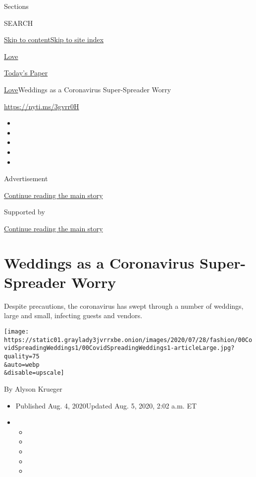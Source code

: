 Sections

SEARCH

\protect\hyperlink{site-content}{Skip to
content}\protect\hyperlink{site-index}{Skip to site index}

\href{https://www.nytimes3xbfgragh.onion/section/fashion/weddings}{Love}

\href{https://myaccount.nytimes3xbfgragh.onion/auth/login?response_type=cookie\&client_id=vi}{}

\href{https://www.nytimes3xbfgragh.onion/section/todayspaper}{Today's
Paper}

\href{/section/fashion/weddings}{Love}\textbar{}Weddings as a
Coronavirus Super-Spreader Worry

\url{https://nyti.ms/3gvrr0H}

\begin{itemize}
\item
\item
\item
\item
\item
\end{itemize}

Advertisement

\protect\hyperlink{after-top}{Continue reading the main story}

Supported by

\protect\hyperlink{after-sponsor}{Continue reading the main story}

\hypertarget{weddings-as-a-coronavirus-super-spreader-worry}{%
\section{Weddings as a Coronavirus Super-Spreader
Worry}\label{weddings-as-a-coronavirus-super-spreader-worry}}

Despite precautions, the coronavirus has swept through a number of
weddings, large and small, infecting guests and vendors.

\texttt{[image: https://static01.graylady3jvrrxbe.onion/images/2020/07/28/fashion/00CovidSpreadingWeddings1/00CovidSpreadingWeddings1-articleLarge.jpg?quality=75\\\&auto=webp\\\&disable=upscale]}

By Alyson Krueger

\begin{itemize}
\item
  Published Aug. 4, 2020Updated Aug. 5, 2020, 2:02 a.m. ET
\item
  \begin{itemize}
  \item
  \item
  \item
  \item
  \item
  \end{itemize}
\end{itemize}

